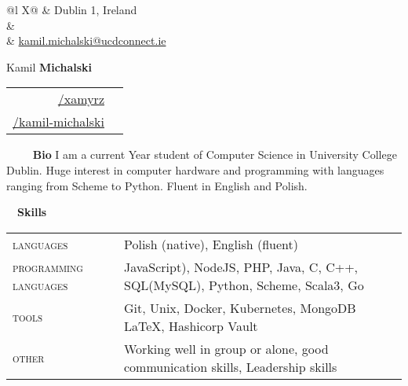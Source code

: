 \documentclass[a4paper, 11pt]{article}
\newcommand{\sectitle}[2]{\large{#1} \ \ \Large{\textbf{#2}}}
\begin{document}
	\pagestyle{fancy}

	\begin{center}
	\begin{multicols}{3}
		\begin{tabularx}{\linewidth}{@{}l X@{}}
			\faMapMarker & Dublin 1, Ireland \\
			\IfFileExists{confidential.tex}{\faPhone & \href{tel:\phoneNumber}{\prettyPhoneNumber} \\}{}
			\faEnvelope	 & \href{mailto:kamil.michalski@ucdconnect.ie}{kamil.michalski@ucdconnect.ie} \\
		\end{tabularx} \vfill \null

		\columnbreak
			{ \Huge{Kamil \textbf{Michalski}}}
		\columnbreak

		\begin{tabularx}{\linewidth}{R | r}
				\href{https://github.com/xamyrz}{/xamyrz} & \faGithub \\
				\href{https://www.linkedin.com/in/kamil-michalski-7069451ab/}{/kamil-michalski} & \faLinkedin \\
		\end{tabularx} \vfill \null
	\end{multicols}
	\end{center}

	\vspace{-3.5mm}
	\begin{section}{\sectitle{\ \faUser}{\ Bio}}
		I am a current  Year student of Computer Science in University College Dublin. Huge interest in computer hardware and programming with languages ranging from Scheme to Python. Fluent in English and Polish. \\
	\end{section}
	\vspace{-3.5mm}

	\newcommand{\education}[6]{
		\textsc{#1} & #3: \textbf{#4} & \small{#5} \\[-0.5ex]
		\textsc{#2} & \multicolumn{2}{l}{\footnotesize #6}\\
	}

		\begin{section}{\sectitle{\faCogs}{Skills}}
		\begin{tabularx}{\linewidth}{@{}l  X}
			\textsc{languages} & Polish (native), English (fluent)\\
			\textsc{programming languages} & JavaScript), NodeJS, PHP, Java, C, C++, SQL(MySQL), Python, Scheme, Scala3, Go \\
			\textsc{tools} & Git, Unix, Docker, Kubernetes, MongoDB \LaTeX, Hashicorp Vault \\
			\textsc{other} & Working well in group or alone, good communication skills, Leadership skills
		\end{tabularx}
		\\ \\
	\end{section}
	\vspace{-3.5mm}
\end{document}
